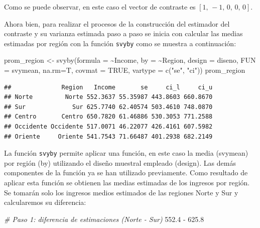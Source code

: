 \documentclass[
  12pt,
]{book}
\newenvironment{Shaded}{\begin{snugshade}}{\end{snugshade}}
\newcommand{\AttributeTok}[1]{\textcolor[rgb]{0.77,0.63,0.00}{#1}}
\newcommand{\CommentTok}[1]{\textcolor[rgb]{0.56,0.35,0.01}{\textit{#1}}}
\newcommand{\ConstantTok}[1]{\textcolor[rgb]{0.00,0.00,0.00}{#1}}
\newcommand{\FloatTok}[1]{\textcolor[rgb]{0.00,0.00,0.81}{#1}}
\newcommand{\FunctionTok}[1]{\textcolor[rgb]{0.00,0.00,0.00}{#1}}
\newcommand{\NormalTok}[1]{#1}
\newcommand{\OtherTok}[1]{\textcolor[rgb]{0.56,0.35,0.01}{#1}}
\newcommand{\SpecialCharTok}[1]{\textcolor[rgb]{0.00,0.00,0.00}{#1}}
\newcommand{\StringTok}[1]{\textcolor[rgb]{0.31,0.60,0.02}{#1}}
\begin{document}
Como se puede observar, en este caso el vector de contraste es \(\left[1,\,-1,\,0,\,0,\,0\right]\).

Ahora bien, para realizar el procesos de la construcción del estimador del contraste y su varianza estimada paso a paso se inicia con calcular las medias estimadas por región con la función \texttt{svyby} como se muestra a continuación:

\begin{Shaded}
\begin{Highlighting}[]
\NormalTok{prom\_region }\OtherTok{\textless{}{-}} \FunctionTok{svyby}\NormalTok{(}\AttributeTok{formula =} \SpecialCharTok{\textasciitilde{}}\NormalTok{Income, }
                      \AttributeTok{by =} \SpecialCharTok{\textasciitilde{}}\NormalTok{Region, }
                      \AttributeTok{design =}\NormalTok{ diseno, }
                      \AttributeTok{FUN =}\NormalTok{ svymean, }
                      \AttributeTok{na.rm=}\NormalTok{T, }
                      \AttributeTok{covmat =} \ConstantTok{TRUE}\NormalTok{, }
                      \AttributeTok{vartype =} \FunctionTok{c}\NormalTok{(}\StringTok{"se"}\NormalTok{, }\StringTok{"ci"}\NormalTok{))}
\NormalTok{prom\_region}
\end{Highlighting}
\end{Shaded}

\begin{verbatim}
##              Region   Income       se     ci_l     ci_u
## Norte         Norte 552.3637 55.35987 443.8603 660.8670
## Sur             Sur 625.7740 62.40574 503.4610 748.0870
## Centro       Centro 650.7820 61.46886 530.3053 771.2588
## Occidente Occidente 517.0071 46.22077 426.4161 607.5982
## Oriente     Oriente 541.7543 71.66487 401.2938 682.2149
\end{verbatim}

La función \texttt{svyby} permite aplicar una función, en este caso la media (svymean) por región (by) utilizando el diseño muestral empleado (design). Las demás componentes de la función ya se han utilizado previamente. Como resultado de aplicar esta función se obtienen las medias estimadas de los ingresos por región. Se tomarán solo los ingresos medios estimados de las regiones Norte y Sur y calcularemos su diferencia:

\begin{Shaded}
\begin{Highlighting}[]
\CommentTok{\# Paso 1: diferencia de estimaciones (Norte {-} Sur) }
\FloatTok{552.4} \SpecialCharTok{{-}} \FloatTok{625.8}
\end{Highlighting}
\end{Shaded}
\end{document}

